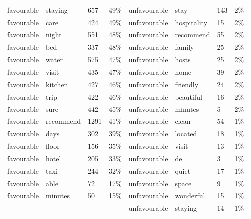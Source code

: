 \documentclass[a4paper, 12pt]{article}
\begin{document}
\begin{longtable}{p{2cm}p{2cm}p{1cm}p{1.6cm}p{2.4cm}p{1.9cm}p{1cm}p{2cm}}
favourable & staying & 657 & 49\% & unfavourable & stay & 143 & 2\% \\
favourable & care & 424 & 49\% & unfavourable & hospitality & 15 & 2\% \\
favourable & night & 551 & 48\% & unfavourable & recommend & 55 & 2\% \\
favourable & bed & 337 & 48\% & unfavourable & family & 25 & 2\% \\
favourable & water & 575 & 47\% & unfavourable & hosts & 25 & 2\% \\
favourable & visit & 435 & 47\% & unfavourable & home & 39 & 2\% \\
favourable & kitchen & 427 & 46\% & unfavourable & friendly & 24 & 2\% \\
favourable & trip & 422 & 46\% & unfavourable & beautiful & 16 & 2\% \\
favourable & sure & 442 & 45\% & unfavourable & minutes & 5 & 2\% \\
favourable & recommend & 1291 & 41\% & unfavourable & clean & 54 & 1\% \\
favourable & days & 302 & 39\% & unfavourable & located & 18 & 1\% \\
favourable & floor & 156 & 35\% & unfavourable & visit & 13 & 1\% \\
favourable & hotel & 205 & 33\% & unfavourable & de & 3 & 1\% \\
favourable & taxi & 244 & 32\% & unfavourable & quiet & 17 & 1\% \\
favourable & able & 72 & 17\% & unfavourable & space & 9 & 1\% \\
favourable & minutes & 50 & 15\% & unfavourable & wonderful & 15 & 1\% \\
 &  &  &  & unfavourable & staying & 14 & 1\% \\

\end{longtable}
\normalsize



	     
                    
\end{document}
